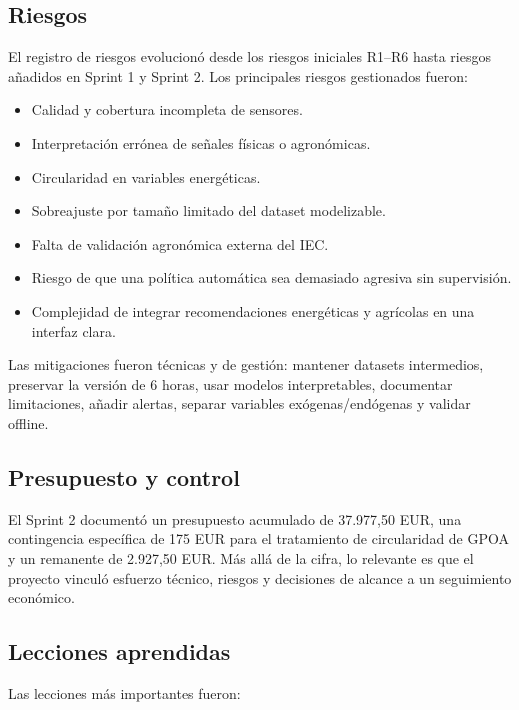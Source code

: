 ﻿\documentclass[11pt,a4paper]{article}
\begin{document}
\subsection{Riesgos}

El registro de riesgos evolucionó desde los riesgos iniciales R1--R6 hasta riesgos añadidos en Sprint 1 y Sprint 2. Los principales riesgos gestionados fueron:

\begin{itemize}
    \item Calidad y cobertura incompleta de sensores.
    \item Interpretación errónea de señales físicas o agronómicas.
    \item Circularidad en variables energéticas.
    \item Sobreajuste por tamaño limitado del dataset modelizable.
    \item Falta de validación agronómica externa del IEC.
    \item Riesgo de que una política automática sea demasiado agresiva sin supervisión.
    \item Complejidad de integrar recomendaciones energéticas y agrícolas en una interfaz clara.
\end{itemize}

Las mitigaciones fueron técnicas y de gestión: mantener datasets intermedios, preservar la versión de 6 horas, usar modelos interpretables, documentar limitaciones, añadir alertas, separar variables exógenas/endógenas y validar offline.

\subsection{Presupuesto y control}

El Sprint 2 documentó un presupuesto acumulado de 37.977,50 EUR, una contingencia específica de 175 EUR para el tratamiento de circularidad de GPOA y un remanente de 2.927,50 EUR. Más allá de la cifra, lo relevante es que el proyecto vinculó esfuerzo técnico, riesgos y decisiones de alcance a un seguimiento económico.

\subsection{Lecciones aprendidas}

Las lecciones más importantes fueron:
\end{document}
